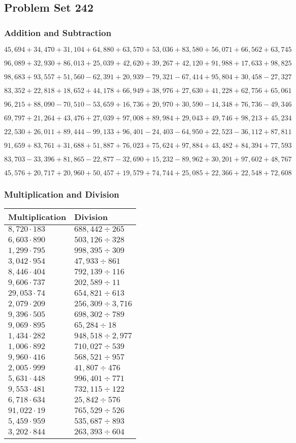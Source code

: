 \hypertarget{problem-set-242}{%
\subsection{Problem Set 242}\label{problem-set-242}}

\hypertarget{addition-and-subtraction}{%
\subsubsection{Addition and
Subtraction}\label{addition-and-subtraction}}

\(45,694+34,470+31,104+64,880+63,570+53,036+83,580+56,071+66,562+63,745\)

\(96,089+32,930+86,013+25,039+42,620+39,267+42,120+91,988+17,633+98,825\)

\(98,683+93,557+51,560-62,391+20,939-79,321-67,414+95,804+30,458-27,327\)

\(83,352+22,818+18,652+44,178+66,949+38,976+27,630+41,228+62,756+65,061\)

\(96,215+88,090-70,510-53,659+16,736+20,970+30,590-14,348+76,736-49,346\)

\(69,797+21,264+43,476+27,039+97,008+89,984+29,043+49,746+98,213+45,234\)

\(22,530+26,011+89,444-99,133+96,401-24,403-64,950+22,523-36,112+87,811\)

\(91,659+83,761+31,688+51,887+76,023+75,624+97,884+43,482+84,394+77,593\)

\(83,703-33,396+81,865-22,877-32,690+15,232-89,962+30,201+97,602+48,767\)

\(45,576+20,717+20,960+50,457+19,579+74,744+25,085+22,366+22,548+72,608\)

\hypertarget{multiplication-and-division}{%
\subsubsection{Multiplication and
Division}\label{multiplication-and-division}}

\begin{longtable}[]{@{}ll@{}}
\toprule
Multiplication & Division\tabularnewline
\midrule
\endhead
\(8,720\cdot183\) & \(688,442÷265\)\tabularnewline
\(6,603\cdot890\) & \(503,126÷ 328\)\tabularnewline
\(1,299\cdot795\) & \(998,395÷309\)\tabularnewline
\(3,042\cdot954\) & \(47,933÷861\)\tabularnewline
\(8,446\cdot404\) & \(792,139 ÷116\)\tabularnewline
\(9,606\cdot737\) & \(202,589÷11\)\tabularnewline
\(29,053\cdot74\) & \(654,821÷613\)\tabularnewline
\(2,079\cdot209\) & \(256,309÷3,716\)\tabularnewline
\(9,396\cdot505\) & \(698,302÷789\)\tabularnewline
\(9,069\cdot895\) & \(65,284÷18\)\tabularnewline
\(1,434\cdot282\) & \(948,518÷2,977\)\tabularnewline
\(1,006\cdot892\) & \(710,027÷539\)\tabularnewline
\(9,960\cdot416\) & \(568,521÷957\)\tabularnewline
\(2,005\cdot999\) & \(41,807÷476\)\tabularnewline
\(5,631\cdot448\) & \(996,401÷771\)\tabularnewline
\(9,553\cdot481\) & \(732,115÷122\)\tabularnewline
\(6,718\cdot634\) & \(25,842÷576\)\tabularnewline
\(91,022\cdot19\) & \(765,529÷526\)\tabularnewline
\(5,459\cdot959\) & \(535,687÷893\)\tabularnewline
\(3,202\cdot844\) & \(263,393÷604\)\tabularnewline
\bottomrule
\end{longtable}
